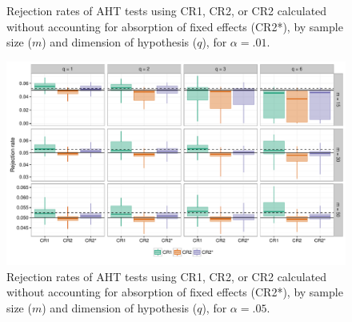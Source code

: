 \documentclass{article}\usepackage[]{graphicx}\usepackage[]{color}
\newenvironment{knitrout}{}{} %
\begin{document}
\begin{landscape}
\begin{knitrout}
\begin{figure}[H]
\caption[Rejection rates of AHT tests using CR1, CR2, or CR2 calculated without accounting for absorption of fixed effects (CR2*), by sample size (]{Rejection rates of AHT tests using CR1, CR2, or CR2 calculated without accounting for absorption of fixed effects (CR2*), by sample size ($m$) and dimension of hypothesis ($q$), for $\alpha = .01$.}\label{fig:absorption_01}
\end{figure}


\end{knitrout}

\begin{knitrout}
\color{fgcolor}\begin{figure}[H]

{\centering \includegraphics[width=\linewidth]{CR_fig/absorption_05-1} 

}

\caption[Rejection rates of AHT tests using CR1, CR2, or CR2 calculated without accounting for absorption of fixed effects (CR2*), by sample size (]{Rejection rates of AHT tests using CR1, CR2, or CR2 calculated without accounting for absorption of fixed effects (CR2*), by sample size ($m$) and dimension of hypothesis ($q$), for $\alpha = .05$.}\label{fig:absorption_05}
\end{figure}


\end{knitrout}

\begin{knitrout}
\color{fgcolor}\begin{figure}[H]


\end{figure}
\end{knitrout}
\end{landscape}
\end{document}
